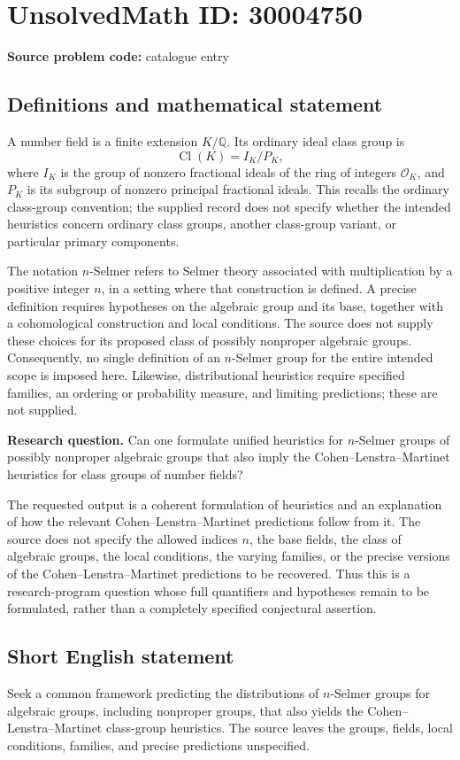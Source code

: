 \documentclass[11pt]{article}
\newcommand{\Q}{\mathbb{Q}}
\begin{document}
\section*{UnsolvedMath ID: 30004750}
\textbf{Source problem code:} catalogue entry
\subsection{Definitions and mathematical statement}
A number field is a finite extension \(K/\Q\). Its ordinary ideal class group is
\[
\operatorname{Cl}(K)=I_K/P_K,
\]
where \(I_K\) is the group of nonzero fractional ideals of the ring of integers \(\mathcal O_K\), and \(P_K\) is its subgroup of nonzero principal fractional ideals. This recalls the ordinary class-group convention; the supplied record does not specify whether the intended heuristics concern ordinary class groups, another class-group variant, or particular primary components.

The notation \(n\)-Selmer refers to Selmer theory associated with multiplication by a positive integer \(n\), in a setting where that construction is defined. A precise definition requires hypotheses on the algebraic group and its base, together with a cohomological construction and local conditions. The source does not supply these choices for its proposed class of possibly nonproper algebraic groups. Consequently, no single definition of an \(n\)-Selmer group for the entire intended scope is imposed here. Likewise, distributional heuristics require specified families, an ordering or probability measure, and limiting predictions; these are not supplied.

\textbf{Research question.} Can one formulate unified heuristics for \(n\)-Selmer groups of possibly nonproper algebraic groups that also imply the Cohen--Lenstra--Martinet heuristics for class groups of number fields?

The requested output is a coherent formulation of heuristics and an explanation of how the relevant Cohen--Lenstra--Martinet predictions follow from it. The source does not specify the allowed indices \(n\), the base fields, the class of algebraic groups, the local conditions, the varying families, or the precise versions of the Cohen--Lenstra--Martinet predictions to be recovered. Thus this is a research-program question whose full quantifiers and hypotheses remain to be formulated, rather than a completely specified conjectural assertion.
\subsection{Short English statement}
Seek a common framework predicting the distributions of \(n\)-Selmer groups for algebraic groups, including nonproper groups, that also yields the Cohen--Lenstra--Martinet class-group heuristics. The source leaves the groups, fields, local conditions, families, and precise predictions unspecified.
\end{document}
